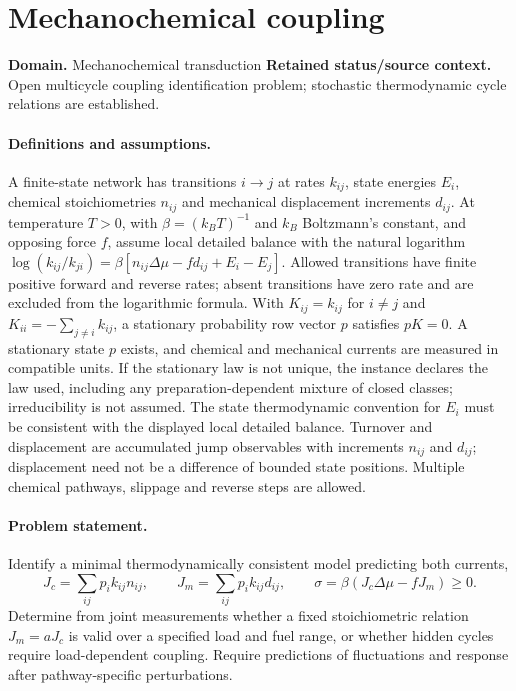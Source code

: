 \documentclass[11pt]{article}
\begin{document}
\section*{Mechanochemical coupling}
\label{prob:094}
\label{rank:137}
\par\smallskip

\noindent\textbf{Domain.} Mechanochemical transduction \quad \textbf{Retained status/source context.} Open multicycle coupling identification problem; stochastic thermodynamic cycle relations are established.
\paragraph{Definitions and assumptions.} A finite-state network has transitions $i\to j$ at rates $k_{ij}$, state energies $E_i$, chemical stoichiometries $n_{ij}$ and mechanical displacement increments $d_{ij}$. At temperature $T>0$, with $\beta=(k_BT)^{-1}$ and $k_B$ Boltzmann's constant, and opposing force $f$, assume local detailed balance with the natural logarithm
$\log(k_{ij}/k_{ji})=\beta[n_{ij}\Delta\mu-fd_{ij}+E_i-E_j]$.
Allowed transitions have finite positive forward and reverse rates; absent transitions have zero rate and are excluded from the logarithmic formula. With $K_{ij}=k_{ij}$ for $i\ne j$ and $K_{ii}=-\sum_{j\ne i}k_{ij}$, a stationary probability row vector $p$ satisfies $pK=0$. A stationary state $p$ exists, and chemical and mechanical currents are measured in compatible units. If the stationary law is not unique, the instance declares the law used, including any preparation-dependent mixture of closed classes; irreducibility is not assumed. The state thermodynamic convention for $E_i$ must be consistent with the displayed local detailed balance. Turnover and displacement are accumulated jump observables with increments $n_{ij}$ and $d_{ij}$; displacement need not be a difference of bounded state positions. Multiple chemical pathways, slippage and reverse steps are allowed.
\paragraph{Problem statement.} Identify a minimal thermodynamically consistent model predicting both currents,
\[J_c=\sum_{ij}p_i k_{ij}n_{ij},\qquad J_m=\sum_{ij}p_i k_{ij}d_{ij},\qquad \sigma=\beta(J_c\Delta\mu-fJ_m)\ge0.\]
Determine from joint measurements whether a fixed stoichiometric relation $J_m=aJ_c$ is valid over a specified load and fuel range, or whether hidden cycles require load-dependent coupling. Require predictions of fluctuations and response after pathway-specific perturbations.
\end{document}
